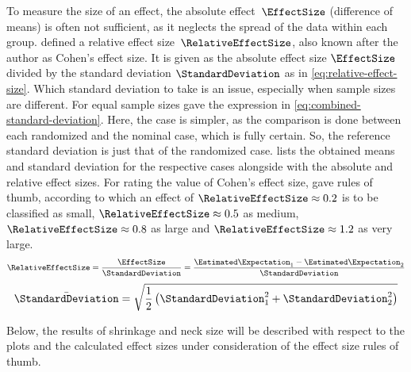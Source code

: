 To measure the size of an effect, the absolute effect~$\EffectSize$ (difference of means) is often not sufficient, as it neglects the spread of the data within each group.
\textcite{Cohen1988} defined a relative effect size~$\RelativeEffectSize$, also known after the author as Cohen's effect size.
It is given as the absolute effect size $\EffectSize$ divided by the standard deviation $\StandardDeviation$ as in \cref{eq:relative-effect-size}.
Which standard deviation to take is an issue, especially when sample sizes are different.
For equal sample sizes \textcite{Cohen1988} gave the expression in \cref{eq:combined-standard-deviation}.
Here, the case is simpler, as the comparison is done between each randomized and the nominal case, which is fully certain.
So, the reference standard deviation is just that of the randomized case.
 lists the obtained means and standard deviation for the respective cases alongside with the absolute and relative effect sizes.
For rating the value of Cohen's effect size, \textcite{Sawilowsky2009} gave rules of thumb, according to which an effect of $\RelativeEffectSize \approx \num{0.2}$ is to be classified as small, $\RelativeEffectSize \approx \num{0.5}$ as medium, $\RelativeEffectSize \approx \num{0.8}$ as large and  $\RelativeEffectSize \approx \num{1.2}$ as very large.
\begin{equation}
    \RelativeEffectSize = \frac{\EffectSize}{\StandardDeviation} = \frac{\Estimated\Expectation_1 - \Estimated\Expectation_2}{\StandardDeviation}
    \label{eq:relative-effect-size}
\end{equation}
\begin{equation}
    \bar\StandardDeviation = \sqrt{\frac12 \left( \StandardDeviation_1^2 + \StandardDeviation_2^2 \right) }
    \label{eq:combined-standard-deviation}
\end{equation}

Below, the results of shrinkage and neck size will be described with respect to the plots and the calculated effect sizes under consideration of the effect size rules of thumb.

